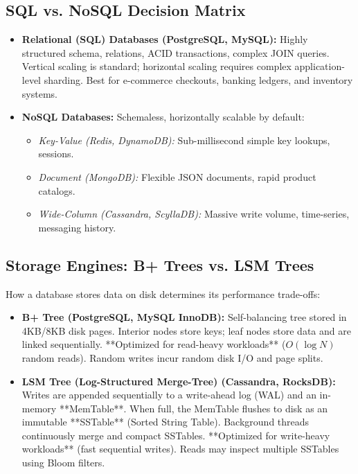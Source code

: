 \documentclass[10pt,journal,compsoc,onecolumn]{IEEEtran}
\begin{document}
\subsection{SQL vs. NoSQL Decision Matrix}
\begin{itemize}
    \item \textbf{Relational (SQL) Databases (PostgreSQL, MySQL):} Highly structured schema, relations, ACID transactions, complex JOIN queries. Vertical scaling is standard; horizontal scaling requires complex application-level sharding. Best for e-commerce checkouts, banking ledgers, and inventory systems.
    \item \textbf{NoSQL Databases:} Schemaless, horizontally scalable by default:
    \begin{itemize}
        \item \emph{Key-Value (Redis, DynamoDB):} Sub-millisecond simple key lookups, sessions.
        \item \emph{Document (MongoDB):} Flexible JSON documents, rapid product catalogs.
        \item \emph{Wide-Column (Cassandra, ScyllaDB):} Massive write volume, time-series, messaging history.
    \end{itemize}
\end{itemize}

\subsection{Storage Engines: B+ Trees vs. LSM Trees}
How a database stores data on disk determines its performance trade-offs:
\begin{itemize}
    \item \textbf{B+ Tree (PostgreSQL, MySQL InnoDB):} Self-balancing tree stored in 4KB/8KB disk pages. Interior nodes store keys; leaf nodes store data and are linked sequentially. **Optimized for read-heavy workloads** ($O(\log N)$ random reads). Random writes incur random disk I/O and page splits.
    \item \textbf{LSM Tree (Log-Structured Merge-Tree) (Cassandra, RocksDB):} Writes are appended sequentially to a write-ahead log (WAL) and an in-memory **MemTable**. When full, the MemTable flushes to disk as an immutable **SSTable** (Sorted String Table). Background threads continuously merge and compact SSTables. **Optimized for write-heavy workloads** (fast sequential writes). Reads may inspect multiple SSTables using Bloom filters.
\end{itemize}
\end{document}
